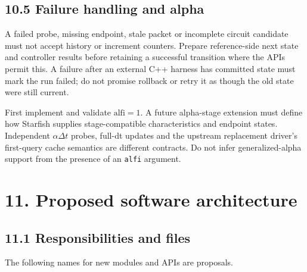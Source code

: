 \documentclass[11pt,a4paper]{article}
\begin{document}
\subsection{10.5 Failure handling and alpha}
A failed probe, missing endpoint, stale packet or incomplete circuit candidate must not accept history or increment counters. Prepare reference-side next state and controller results before retaining a successful transition where the APIs permit this. A failure after an external C++ harness has committed state must mark the run failed; do not promise rollback or retry it as though the old state were still current.

First implement and validate \(\mathrm{alfi}=1\). A future alpha-stage extension must define how Starfish supplies stage-compatible characteristics and endpoint states. Independent \(\alpha\Delta t\) probes, full-dt updates and the upstream replacement driver's first-query cache semantics are different contracts. Do not infer generalized-alpha support from the presence of an \texttt{alfi} argument.

\section{11. Proposed software architecture}
\subsection{11.1 Responsibilities and files}
The following names for new modules and APIs are proposals.
\end{document}
